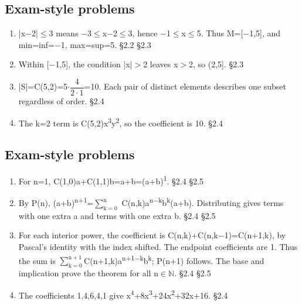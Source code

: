 \documentclass[11pt]{article}
\begin{document}
\begin{keepsection}\subsection{Exam-style problems}

\begin{enumerate}
\item |x\ensuremath{-}2|\ensuremath{\leq}3 means \ensuremath{-}3\ensuremath{\leq}x\ensuremath{-}2\ensuremath{\leq}3, hence \ensuremath{-}1\ensuremath{\leq}x\ensuremath{\leq}5. Thus M=[\ensuremath{-}1,5], and min=inf=\ensuremath{-}1, max=sup=5. \hfill{\small\color{FAUblue}§2.2} \hfill{\small\color{FAUblue}§2.3}
\item Within [\ensuremath{-}1,5], the condition |x|\ensuremath{>}2 leaves x\ensuremath{>}2, so (2,5]. \hfill{\small\color{FAUblue}§2.3}
\item |S|=C(5,2)=5\ensuremath{\cdot}{\small\ensuremath{\dfrac{4}{2\cdot 1}}}=10. Each pair of distinct elements describes one subset regardless of order. \hfill{\small\color{FAUblue}§2.4}
\item The k=2 term is C(5,2)x\textsuperscript{3}y\textsuperscript{2}, so the coefficient is 10. \hfill{\small\color{FAUblue}§2.4}
\end{enumerate}

\end{keepsection}
\begin{keepsection}\subsection{Exam-style problems}

\begin{enumerate}
\item For n=1, C(1,0)a+C(1,1)b=a+b=(a+b)\textsuperscript{1}. \hfill{\small\color{FAUblue}§2.4} \hfill{\small\color{FAUblue}§2.5}
\item By P(n), (a+b)\textsuperscript{n+1}=$\sum_{\mathrm{k}=0}^{\mathrm{n}} $ C(n,k)a\textsuperscript{n\ensuremath{-}k}b\textsuperscript{k}(a+b). Distributing gives terms with one extra a and terms with one extra b. \hfill{\small\color{FAUblue}§2.4} \hfill{\small\color{FAUblue}§2.5}
\item For each interior power, the coefficient is C(n,k)+C(n,k\ensuremath{-}1)=C(n+1,k), by Pascal’s identity with the index shifted. The endpoint coefficients are 1. Thus the sum is $\sum_{\mathrm{k}=0}^{\mathrm{n}+1} $C(n+1,k)a\textsuperscript{n+1\ensuremath{-}k}b\textsuperscript{k}; P(n+1) follows. The base and implication prove the theorem for all n\ensuremath{\in}\ensuremath{\mathbb{N}}. \hfill{\small\color{FAUblue}§2.4} \hfill{\small\color{FAUblue}§2.5}
\item The coefficients 1,4,6,4,1 give x\textsuperscript{4}+8x\textsuperscript{3}+24x\textsuperscript{2}+32x+16. \hfill{\small\color{FAUblue}§2.4}
\end{enumerate}

\end{keepsection}
\end{document}
